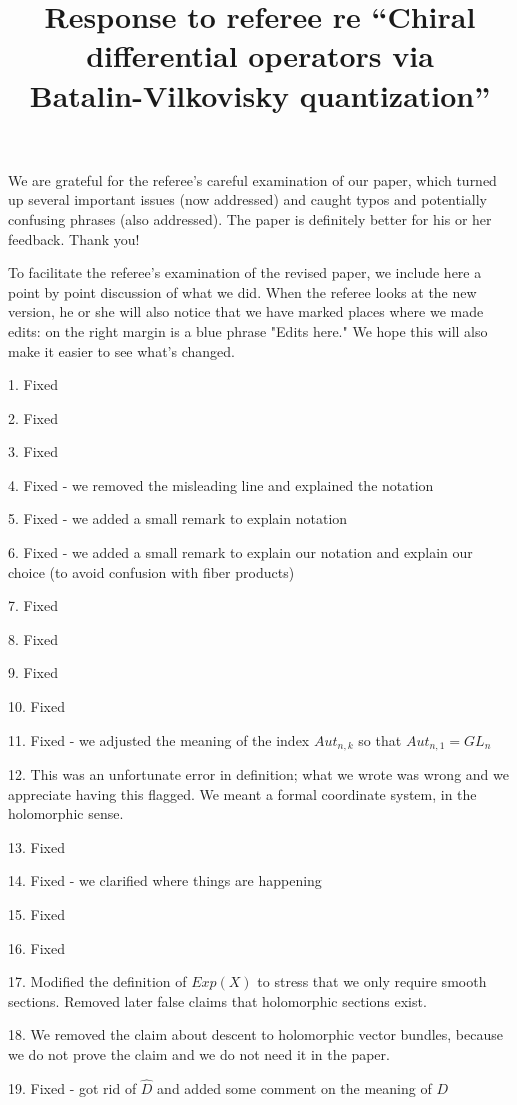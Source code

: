 \documentclass[10pt]{amsart}
\title{Response to referee re ``Chiral differential operators via\\Batalin-Vilkovisky quantization''}
\begin{document}
\maketitle

We are grateful for the referee's careful examination of our paper, 
which turned up several important issues (now addressed) and caught typos and potentially confusing phrases (also addressed).
The paper is definitely better for his or her feedback.
Thank you!

To facilitate the referee's examination of the revised paper, 
we include here a point by point discussion of what we did.
When the referee looks at the new version, 
he or she will also notice that we have marked places where we made edits:
on the right margin is a blue phrase "Edits here."
We hope this will also make it easier to see what's changed.

1. Fixed

2. Fixed

3. Fixed

4. Fixed - we removed the misleading line and explained the notation

5. Fixed - we added a small remark to explain notation

6. Fixed - we added a small remark to explain our notation and explain our choice (to avoid confusion with fiber products)

7. Fixed

8. Fixed

9. Fixed

10. Fixed

11. Fixed - we adjusted the meaning of the index $Aut_{n,k}$ so that $Aut_{n,1} = GL_n$

12. This was an unfortunate error in definition; what we wrote was wrong and we appreciate having this flagged. We meant a formal coordinate system, in the holomorphic sense. 

13. Fixed

14. Fixed - we clarified where things are happening 

15. Fixed

16. Fixed

17. Modified the definition of $Exp(X)$ to stress that we only require smooth sections. 
Removed later false claims that holomorphic sections exist.

18. We removed the claim about descent to holomorphic vector bundles, because we do not prove the claim and we do not need it in the paper.

19. Fixed - got rid of $\hat{D}$ and added some comment on the meaning of $D$
\end{document}

